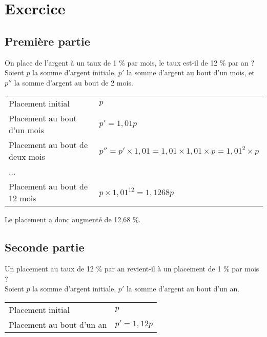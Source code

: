 \newpage

\section{Exercice }

\subsection*{Première partie}

On place de l'argent à un taux de 1 \% par mois, le taux est-il de 12 \% par an ? \\

Soient $p$ la somme d'argent initiale, $p'$ la somme d'argent au bout d'un mois, et $p''$ la somme d'argent au bout de 2 mois. \\

\begin{tabular}{ll}
Placement initial & $p$ \\
Placement au bout d'un mois & $p' = 1,01p$ \\
Placement au bout de deux mois & $p'' = p' \times 1,01 = 1,01 \times 1,01 \times p = 1,01^2 \times p $ \\
... & \\
Placement au bout de 12 mois & $ p \times 1,01^{12} = 1,1268p $ \\
\end{tabular}

\vspace{.3cm}

Le placement a donc augmenté de 12,68 \%.

\subsection*{Seconde partie}

Un placement au taux de 12 \% par an revient-il à un placement de 1 \% par mois ? \\

Soient $p$ la somme d'argent initiale, $p'$ la somme d'argent au bout d'un an. \\

\begin{tabular}{ll}
Placement initial & $p$ \\
Placement au bout d'un an & $p' = 1,12p$ \\
\end{tabular}

\vspace{.3cm}

